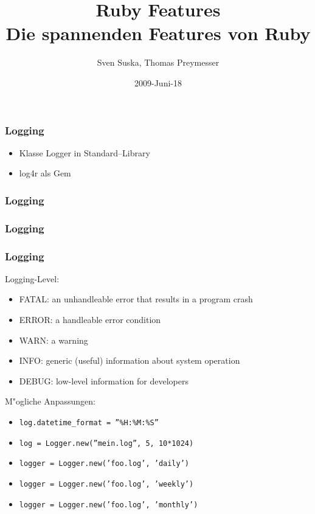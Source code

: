 \documentclass{beamer}
\title[Ruby]{Ruby Features\\Die spannenden Features von Ruby}
\author{Sven Suska, Thomas Preymesser}
\date{2009-Juni-18}
\begin{document}
\lstset{language=Ruby}
\lstset{basicstyle=\small,numbers=left, numberstyle=\tiny, numbersep=5pt}
\begin{frame}
\titlepage
\end{frame}










\begin{frame}
  \frametitle{Logging}
  \begin{itemize}
    \item Klasse Logger in Standard--Library
    \item log4r als Gem
  \end{itemize}
\end{frame}

\begin{frame}
  \frametitle{Logging}
  
\end{frame}

\begin{frame}
  \frametitle{Logging}
  
\end{frame}

\begin{frame}
  \frametitle{Logging}
  Logging-Level:
  \begin{itemize}
    \item FATAL: an unhandleable error that results in a program crash
    \item ERROR: a handleable error condition
    \item WARN:	a warning
    \item INFO:	generic (useful) information about system operation
    \item DEBUG: low-level information for developers 
  \end{itemize}

  M"ogliche Anpassungen:
  \begin{itemize}
    \item \texttt{log.datetime\_format = ''\%H:\%M:\%S''}
    \item \texttt{log = Logger.new(''mein.log'', 5, 10*1024)}
    \item \texttt{logger = Logger.new('foo.log', 'daily')}
    \item \texttt{logger = Logger.new('foo.log', 'weekly')}
    \item \texttt{logger = Logger.new('foo.log', 'monthly')}
 
  \end{itemize}
\end{frame}
\end{document}

